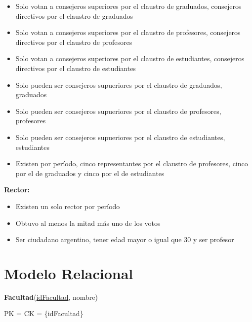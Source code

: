 \documentclass[a4paper, 10pt, twoside]{article}
\begin{document}
\begin{itemize}
\item Solo votan a consejeros superiores por el claustro de graduados, consejeros directivos por el claustro de graduados
\item Solo votan a consejeros superiores por el claustro de profesores, consejeros directivos por el claustro de profesores
\item Solo votan a consejeros superiores por el claustro de estudiantes, consejeros directivos por el claustro de estudiantes
\item Solo pueden ser consejeros supueriores por el claustro de graduados, graduados
\item Solo pueden ser consejeros supueriores por el claustro de profesores, profesores
\item Solo pueden ser consejeros supueriores por el claustro de estudiantes, estudiantes
\item Existen por período, cinco representantes por el claustro de profesores, cinco por el de graduados y cinco por el de estudiantes
\end{itemize}

\textbf{Rector:}

\begin{itemize}
\item Existen un solo rector por período
\item Obtuvo al menos la mitad más uno de los votos
\item Ser ciudadano argentino, tener edad mayor o igual que 30 y ser profesor
\end{itemize}



\section{Modelo Relacional}


\textbf{Facultad}(\underline{idFacultad}, nombre)

PK = CK = \{idFacultad\}
\end{document}
